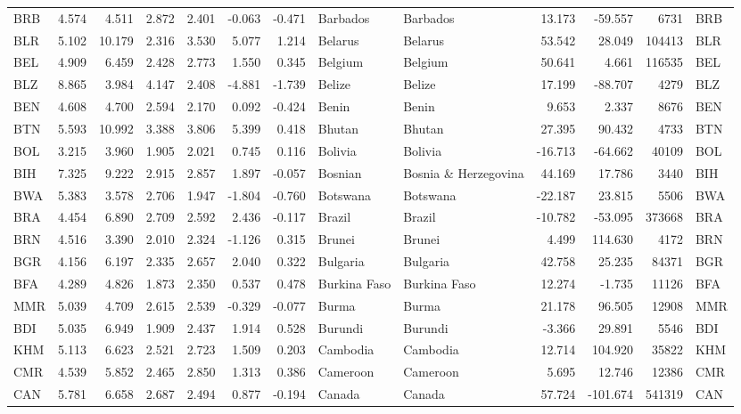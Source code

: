 \begin{tabular}{lrrrrrrllrrrl}
BRB & 4.574 & 4.511 & 2.872 & 2.401 & -0.063 & -0.471 & Barbados & Barbados & 13.173 & -59.557 & 6731 & BRB \\
BLR & 5.102 & 10.179 & 2.316 & 3.530 & 5.077 & 1.214 & Belarus & Belarus & 53.542 & 28.049 & 104413 & BLR \\
BEL & 4.909 & 6.459 & 2.428 & 2.773 & 1.550 & 0.345 & Belgium & Belgium & 50.641 & 4.661 & 116535 & BEL \\
BLZ & 8.865 & 3.984 & 4.147 & 2.408 & -4.881 & -1.739 & Belize & Belize & 17.199 & -88.707 & 4279 & BLZ \\
BEN & 4.608 & 4.700 & 2.594 & 2.170 & 0.092 & -0.424 & Benin & Benin & 9.653 & 2.337 & 8676 & BEN \\
BTN & 5.593 & 10.992 & 3.388 & 3.806 & 5.399 & 0.418 & Bhutan & Bhutan & 27.395 & 90.432 & 4733 & BTN \\
BOL & 3.215 & 3.960 & 1.905 & 2.021 & 0.745 & 0.116 & Bolivia & Bolivia & -16.713 & -64.662 & 40109 & BOL \\
BIH & 7.325 & 9.222 & 2.915 & 2.857 & 1.897 & -0.057 & Bosnian & Bosnia \& Herzegovina & 44.169 & 17.786 & 3440 & BIH \\
BWA & 5.383 & 3.578 & 2.706 & 1.947 & -1.804 & -0.760 & Botswana & Botswana & -22.187 & 23.815 & 5506 & BWA \\
BRA & 4.454 & 6.890 & 2.709 & 2.592 & 2.436 & -0.117 & Brazil & Brazil & -10.782 & -53.095 & 373668 & BRA \\
BRN & 4.516 & 3.390 & 2.010 & 2.324 & -1.126 & 0.315 & Brunei & Brunei & 4.499 & 114.630 & 4172 & BRN \\
BGR & 4.156 & 6.197 & 2.335 & 2.657 & 2.040 & 0.322 & Bulgaria & Bulgaria & 42.758 & 25.235 & 84371 & BGR \\
BFA & 4.289 & 4.826 & 1.873 & 2.350 & 0.537 & 0.478 & Burkina Faso & Burkina Faso & 12.274 & -1.735 & 11126 & BFA \\
MMR & 5.039 & 4.709 & 2.615 & 2.539 & -0.329 & -0.077 & Burma & Burma & 21.178 & 96.505 & 12908 & MMR \\
BDI & 5.035 & 6.949 & 1.909 & 2.437 & 1.914 & 0.528 & Burundi & Burundi & -3.366 & 29.891 & 5546 & BDI \\
KHM & 5.113 & 6.623 & 2.521 & 2.723 & 1.509 & 0.203 & Cambodia & Cambodia & 12.714 & 104.920 & 35822 & KHM \\
CMR & 4.539 & 5.852 & 2.465 & 2.850 & 1.313 & 0.386 & Cameroon & Cameroon & 5.695 & 12.746 & 12386 & CMR \\
CAN & 5.781 & 6.658 & 2.687 & 2.494 & 0.877 & -0.194 & Canada & Canada & 57.724 & -101.674 & 541319 & CAN \\

\end{tabular}
